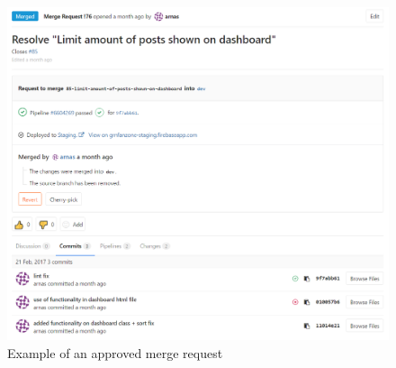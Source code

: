 \begin{figure}[h]
\begin{center}
\includegraphics[width=15cm]{figures/changemgmt_merge_request}
\end{center}
\caption{Example of an approved merge request}
\label{fig:changemgmt_merge_request}
\end{figure}
